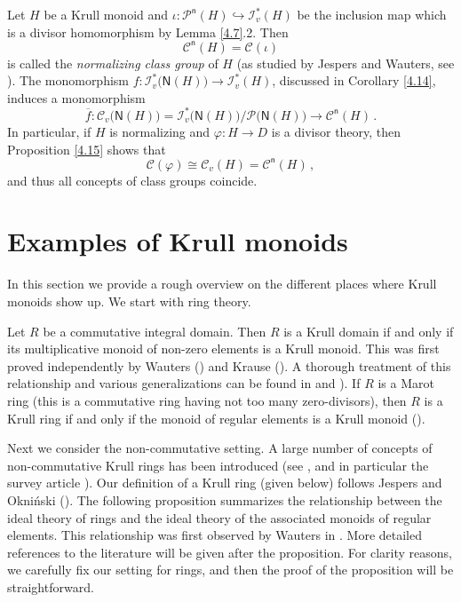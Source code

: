 \documentclass[a4paper]{amsart}
\theoremstyle{definition}
\numberwithin{equation}{section}
\begin{document}
\medskip
Let $H$ be a Krull monoid and $\iota \colon \mathcal P^{\mathsf n}
(H) \hookrightarrow \mathcal I_v^* (H)$ be the inclusion map which
is a divisor homomorphism by Lemma \ref{4.7}.2. Then
\begin{equation}
\mathcal C^{\mathsf n} (H) = \mathcal C (\iota) \label{4.16}
\end{equation}
is called  the {\it normalizing class group} of $H$ (as studied by
Jespers and  Wauters, see \cite[page 332]{Je86a}). The
monomorphism $f \colon \mathcal I_v^* \big( \mathsf N (H) \big) \to
\mathcal I_v^* (H)$, discussed in Corollary \ref{4.14}, induces a
monomorphism
\[
\overline f \colon \mathcal C_v \big( \mathsf N (H) \big) = \mathcal
I_v^* \big( \mathsf N (H) \big)/ \mathcal P \big( \mathsf N (H)
\big) \to \mathcal C^{\mathsf n} (H) \,.
\]
In particular, if $H$ is normalizing and $\varphi \colon H \to D$ is
a divisor theory, then Proposition \ref{4.15} shows that
\begin{equation}
\mathcal C ( \varphi) \cong \mathcal C_v (H) = \mathcal C^{\mathsf
n} (H) \,, \label{4.17}
\end{equation}
and thus all concepts of class groups coincide.

\bigskip
\section{Examples of {K}rull monoids} \label{5}
\bigskip

In this section we provide a rough overview on the different places
where Krull monoids show up. We start with ring theory.

\smallskip
Let $R$ be a commutative integral domain. Then $R$ is a Krull domain
if and only if its multiplicative monoid of non-zero elements is a
Krull monoid. This was first proved independently by  Wauters
(\cite[Corollary 3.6]{Wa84a}) and  Krause (\cite{Kr89}). A
thorough treatment of this relationship and various generalizations
can be found in \cite[Chapters 22 and 23]{HK98} and \cite[Chapter
2]{Ge-HK06a}).  If $R$ is a Marot ring (this is a commutative ring
having not too many zero-divisors), then $R$ is a Krull ring if and
only if the monoid of regular elements is a Krull monoid
(\cite{HK93f}).

\smallskip
Next we consider the non-commutative setting.  A large number of concepts of
non-commutative Krull rings has been introduced (see \cite{Br73a,
Ma74a,Ma76a, Re77a, Re77b, Ma78a, Ch81a, Mi81a, Le83a, Wa-Je86a, Je-Wa86a, Je-Wa88a, Du91a}, and in particular  the survey article
\cite{Je86a}). Our definition of a Krull ring (given below) follows Jespers and  Okni{\'n}ski (\cite[page 56]{Je-Ok07a}). The following proposition summarizes the
relationship between the ideal theory of rings and the ideal theory
of the associated monoids of regular elements. This relationship was
first observed by  Wauters in \cite{Wa84a}. More detailed
references to the literature will be given after the proposition.
For clarity reasons, we carefully fix our setting for rings, and
then the proof of the proposition will be straightforward.
\end{document}
